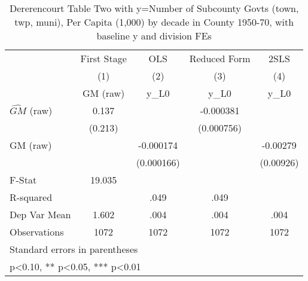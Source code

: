 \begin{table}[htbp]\centering
\def\sym#1{\ifmmode^{#1}\else\(^{#1}\)\fi}
\caption{Dererencourt Table Two with y=Number of Subcounty Govts (town, twp, muni), Per Capita (1,000) by decade in County 1950-70, with baseline y and division FEs}
\begin{tabular}{l*{4}{c}}
\toprule
                    & First Stage   &         OLS   &Reduced Form   &        2SLS   \\
                    &\multicolumn{1}{c}{(1)}&\multicolumn{1}{c}{(2)}&\multicolumn{1}{c}{(3)}&\multicolumn{1}{c}{(4)}\\
                    &\multicolumn{1}{c}{GM  (raw)}&\multicolumn{1}{c}{y\_L0}&\multicolumn{1}{c}{y\_L0}&\multicolumn{1}{c}{y\_L0}\\
\midrule
$\hat{GM}$ (raw)    &       0.137   &               &   -0.000381   &               \\
                    &     (0.213)   &               &  (0.000756)   &               \\
\addlinespace
GM  (raw)           &               &   -0.000174   &               &    -0.00279   \\
                    &               &  (0.000166)   &               &   (0.00926)   \\
\midrule
F-Stat              &      19.035   &               &               &               \\
R-squared           &               &        .049   &        .049   &               \\
Dep Var Mean        &       1.602   &        .004   &        .004   &        .004   \\
Observations        &        1072   &        1072   &        1072   &        1072   \\
\bottomrule
\multicolumn{5}{l}{\footnotesize Standard errors in parentheses}\\
\multicolumn{5}{l}{\footnotesize * p<0.10, ** p<0.05, *** p<0.01}\\
\end{tabular}
\end{table}
